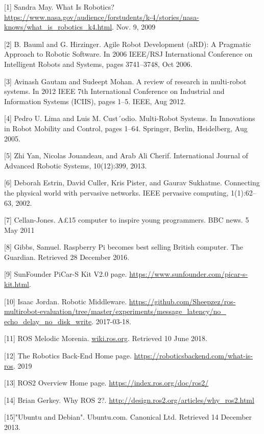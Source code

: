 \documentclass{mproj}
\begin{document}


[1] Sandra May. What Is Robotics?  \url{https://www.nasa.gov/audience/forstudents/k-4/stories/nasa-knows/what_is_robotics_k4.html}. Nov. 9, 2009

[2] B. Bauml and G. Hirzinger. Agile Robot Development (aRD): A Pragmatic Approach to Robotic Software. In 2006 IEEE/RSJ International Conference on Intelligent Robots and Systems, pages 3741–3748, Oct 2006.

[3] Avinash Gautam and Sudeept Mohan. A review of research in multi-robot systems. In 2012 IEEE 7th International Conference on Industrial and Information Systems (ICIIS), pages 1–5. IEEE, Aug 2012.

[4] Pedro U. Lima and Luis M. Cust´odio. Multi-Robot Systems. In Innovations in Robot Mobility and Control, pages 1–64. Springer, Berlin, Heidelberg, Aug 2005.

[5] Zhi Yan, Nicolas Jouandeau, and Arab Ali Cherif. International Journal of Advanced Robotic Systems, 10(12):399, 2013.

[6] Deborah Estrin, David Culler, Kris Pister, and Gaurav Sukhatme. Connecting the physical world with pervasive networks. IEEE pervasive computing, 1(1):62–63, 2002.

[7] Cellan-Jones. A£15 computer to inspire young programmers. BBC news. 5 May 2011

[8] Gibbs, Samuel. Raspberry Pi becomes best selling British computer. The Guardian. Retrieved 28 December 2016.

[9] SunFounder PiCar-S Kit V2.0 page. \url{https://www.sunfounder.com/picar-s-kit.html}. 

[10] Isaac Jordan. Robotic Middleware. \url{https://github.com/Sheepzez/ros-multirobot-evaluation/tree/master/experiments/message_latency/no_ echo_delay_no_disk_write}. 2017-03-18.

[11] ROS Melodic Morenia. \url{wiki.ros.org}. Retrieved 10 June 2018.

[12] The Robotics Back-End Home page. \url{https://roboticsbackend.com/what-is-ros}. 2019

[13] ROS2 Overview Home page. \url{https://index.ros.org/doc/ros2/}

[14]  Brian Gerkey. Why ROS 2?. \url{http://design.ros2.org/articles/why_ros2.html}

[15]"Ubuntu and Debian". Ubuntu.com. Canonical Ltd. Retrieved 14 December 2013.
\end{document}
